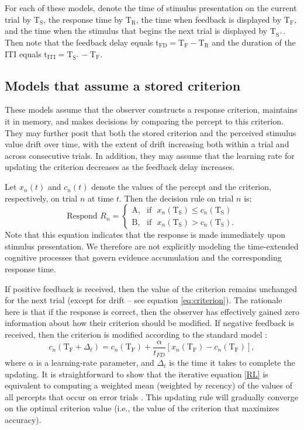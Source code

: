 \documentclass[doc, floatsintext]{apa7}
\begin{document}
For each of these models, denote the time of stimulus
presentation on the current trial by T$_\text{S}$, the
response time by T$_\text{R}$, the time when feedback is
displayed by T$_\text{F}$, and the time when the stimulus
that begins the next trial is displayed by T$_{\text{S}^+}$.
Then note that the feedback delay equals $\text{t}_\text{FD}
= \text{T}_\text{F} - \text{T}_\text{R}$ and the duration of
the ITI equals $\text{t}_\text{ITI} = \text{T}_{\text{S}^+}
- \text{T}_\text{F}$.

\subsection{Models that assume a stored criterion}
These models assume that the observer constructs a response
criterion, maintains it in memory, and makes
decisions by comparing the percept to this criterion. They
may further posit that both the stored criterion and the
perceived stimulus value drift over time, with the extent of
drift increasing both within a trial and across consecutive
trials. In addition, they may assume that the learning rate
for updating the criterion decreases as the feedback delay
increases.

Let $x_n(t)$ and $c_n(t)$ denote the values of the percept
and the criterion, respectively, on trial $n$ at time $t$.
Then the decision rule on trial $n$ is:
\begin{equation}
  \text{Respond } R_n =
  \begin{cases}
    \text{A}, & \text{if ~} x_n(\text{T}_\text{S}) \leq c_n(\text{T}_\text{S})  \\
    \text{B}, & \text{if ~} x_n(\text{T}_\text{S}) > c_n(\text{T}_\text{S}).
  \end{cases}
  \label{eq:DR}
\end{equation}
Note that this equation indicates that the response is made
immediately upon stimulus presentation. We therefore are not
explicitly modeling the time-extended cognitive processes
that govern evidence accumulation and the corresponding
response time.

If positive feedback is received, then the value of the
criterion remains unchanged for the next trial (except for
drift -- see equation \ref{eq:criterion}).  The rationale
here is that if the response is correct, then the observer
has effectively gained zero information about how their
criterion should be modified.  If negative feedback is
received, then the criterion is modified according to the
standard model
\parencite{SuttonBarto1998}:
\begin{equation}
c_n(\text{T}_\text{F}+ \Delta_t) = c_n(\text{T}_\text{F}) + \frac{\alpha}{t_{FD}} [x_n(\text{T}_\text{F}) - c_n(\text{T}_\text{F})],
\label{RL}
\end{equation}
where $\alpha$ is a learning-rate parameter, and $\Delta_t$
is the time it takes to complete the updating.  It is
straightforward to show that the iterative equation \ref{RL}
is equivalent to computing a weighted mean (weighted by
recency) of the values of all percepts that occur on error
trials \parencite[e.g.,][]{Ashby2017}. This updating rule
will gradually converge on the optimal criterion value
(i.e., the value of the criterion that maximizes accuracy).  
\end{document}
